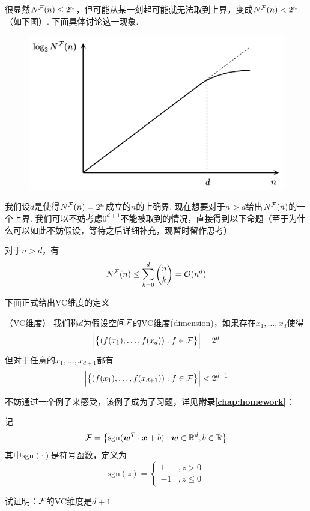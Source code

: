 很显然$N^{\mathcal{F}}(n) \le 2^n$，但可能从某一刻起可能就无法取到上界，变成$N^{\mathcal{F}}(n) < 2^n$（如下图）. 下面具体讨论这一现象.

\begin{figure}[h]
    \centering
    \includegraphics[width=.7\textwidth]{pic/C2_vc-dimension.png}
\end{figure} 

我们设$d$是使得$N^{\mathcal{F}}(n) = 2^n$成立的$n$的上确界. 现在想要对于$n>d$给出$N^{\mathcal{F}}(n)$的一个上界. 我们可以不妨考虑$0^{d+1}$不能被取到的情况，直接得到以下命题（至于为什么可以如此不妨假设，等待之后详细补充，现暂时留作思考）
\begin{proposition}
    对于$n > d$，有 
    \[
    N^{\mathcal{F}}(n) \le \sum_{k=0}^{d} \binom{n}{k} = \mathcal{O}(n^d)
    \]
\end{proposition}

下面正式给出VC维度的定义
\begin{definition} （VC维度）
    我们称$d$为假设空间$\mathcal{F}$的VC维度(dimension)，如果存在$x_1, \dots, x_d$使得 
    \[
    \Big\vert
        \big\{
            (f(x_1), \dots, f(x_d)): f \in \mathcal{F}  
        \big\}
    \Big\vert = 2^d
    \]
    但对于任意的$x_1, \dots, x_{d+1}$都有 
    \[
    \Big\vert
        \big\{
            (f(x_1), \dots, f(x_{d+1})): f \in \mathcal{F}  
        \big\}
    \Big\vert < 2^{d+1}
    \]
\end{definition}

不妨通过一个例子来感受，该例子成为了习题，详见\textbf{附录\ref{chap:homework}}：
\begin{exercise}
    记 
    \[
    \mathcal{F} = \left\{
        \mathrm{sgn}(\boldsymbol{w}^T\cdot \boldsymbol{x} + b): \boldsymbol{w}\in \mathbb{R}^d, b\in \mathbb{R} 
    \right\}
    \]
    其中$\mathrm{sgn}(\cdot)$是符号函数，定义为 
    \[
    \mathrm{sgn}(z) = \begin{cases}
    1 & ,z > 0\\
    -1 & ,z \le 0
    \end{cases}
    \]

    试证明：$\mathcal{F}$的VC维度是$d+1$. 
\end{exercise}